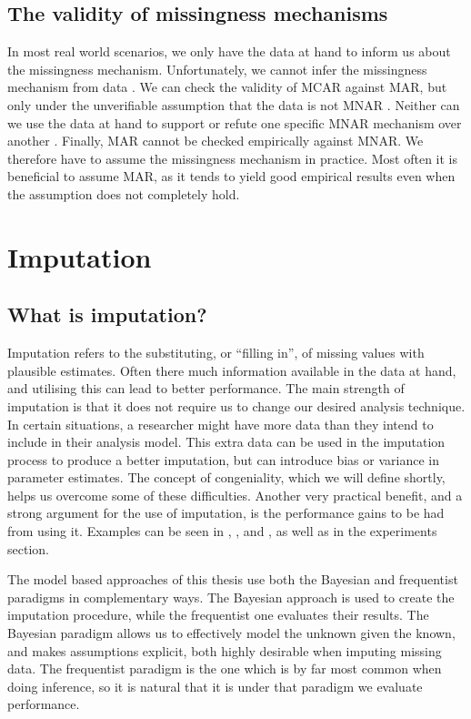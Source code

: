 \documentclass{article}
\begin{document}
	
	\subsection{The validity of missingness mechanisms}
	
	In most real world scenarios, we only have the data at hand to inform us about the missingness mechanism. Unfortunately, we cannot infer the missingness mechanism from data \cite[P.9]{Molenberghs2015}. We can check the validity of MCAR against MAR, but only under the unverifiable assumption that the data is not MNAR \cite[P.8]{Molenberghs2015}. Neither can we use the data at hand to support or refute one specific MNAR mechanism over another \cite[P.10]{Molenberghs2015}. Finally, MAR cannot be checked empirically against MNAR. We therefore have to assume the missingness mechanism in practice. Most often it is beneficial to assume MAR, as it tends to yield good empirical results even when the assumption does not completely hold. 
	
	\section{Imputation}
	
	\subsection{What is imputation?}
	Imputation refers to the substituting, or \enquote{filling in}, of missing values with plausible estimates. Often there much information available in the data at hand, and utilising this can lead to better performance. The main strength of imputation is that it does not require us to change our desired analysis technique.  In certain situations, a researcher might have more data than they intend to include in their analysis model. This extra data can be used in the imputation process to produce a better imputation, but can introduce bias or variance in parameter estimates. The concept of congeniality, which we will define shortly, helps us overcome some of these difficulties. Another very practical benefit, and a strong argument for the use of imputation, is the performance gains to be had from using it. Examples can be seen in \cite{madley-dowd_proportion_2019}, \cite{Schafer2002}, and \cite{Sterne2009}, as well as in the experiments section.
	
	The model based approaches of this thesis use both the Bayesian and frequentist paradigms in complementary ways. The Bayesian approach is used to create the imputation procedure, while the frequentist one evaluates their results. The Bayesian paradigm allows us to effectively model the unknown given the known, and makes assumptions explicit, both highly desirable when imputing missing data. The frequentist paradigm is the one which is by far most common when doing inference, so it is natural that it is under that paradigm we evaluate performance.
	
\end{document}
